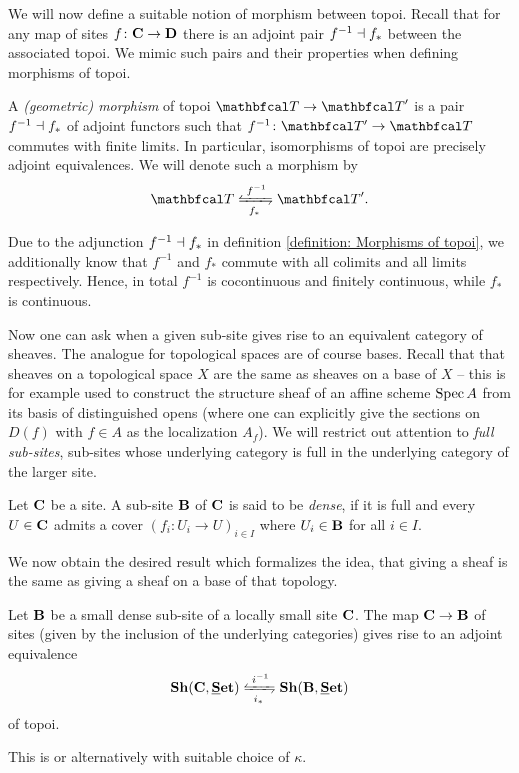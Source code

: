We will now define a suitable notion of morphism between topoi. Recall that for any map of sites $f\colon {{\mathbf{C}}}\to{{\mathbf{D}}}$ there is an adjoint pair $f^{-1}\dashv f_\ast$ between the associated topoi. We mimic such pairs and their properties when defining morphisms of topoi.
\begin{definition}
	\label{definition: Morphisms of topoi}
	
	A \emph{(geometric) morphism} of topoi $\category T\to \category T'$ is a pair $f^{-1} \dashv f_\ast$ of adjoint functors such that $f^{-1}\colon \category{T'}\to\category{T}$ commutes with finite limits. In particular, isomorphisms of topoi are precisely adjoint equivalences. We will denote such a morphism by
		$$\category T \xleftrightarrows{f^{-1}}{f_\ast} \category T'.$$
\end{definition}

\begin{remark}
	Due to the adjunction $f^{-1} \dashv f_\ast$ in definition \ref{definition: Morphisms of topoi}, we additionally know that $f^{-1}$ and $f_\ast$ commute with all colimits and all limits respectively. Hence, in total $f^{-1}$ is cocontinuous and finitely continuous, while $f_\ast$ is continuous.
\end{remark}

Now one can ask when a given sub-site gives rise to an equivalent category of sheaves. The analogue for topological spaces are of course bases. Recall that that sheaves on a topological space $X$ are the same as sheaves on a base of $X$ -- this is for example used to construct the structure sheaf of an affine scheme $\operatorname{Spec} A$ from its basis of distinguished opens (where one can explicitly give the sections on $D(f)$ with $f\in A$ as the localization $A_f$). We will restrict out attention to \emph{full sub-sites}, \ie sub-sites whose underlying category is full in the underlying category of the larger site.
\begin{definition}
	Let ${{\mathbf{C}}}$ be a site. A sub-site ${{\mathbf{B}}}$ of ${{\mathbf{C}}}$ is said to be \emph{dense}, if it is full and every $U\in {{\mathbf{C}}}$ admits a cover $(f_i\colon U_i\to U)_{i\in I}$ where $U_i\in {{\mathbf{B}}}$ for all $i\in I$.
\end{definition}

We now obtain the desired result which formalizes the idea, that giving a sheaf is the same as giving a sheaf on a base of that topology.
\begin{lemma}
	\label{lemma: comparison lemma}
	Let ${{\mathbf{B}}}$ be a small dense sub-site of a locally small site ${{\mathbf{C}}}$. The map ${{\mathbf{C}}}\to{{\mathbf{B}}}$ of sites (given by the inclusion of the underlying categories) gives rise to an adjoint equivalence
		$$\Sheaves{\site C}{\Set}\xleftrightarrows{i^{-1}}{i_\ast} \Sheaves{\site B}{\Set}$$
	of topoi.
\end{lemma}
\begin{shortproof}
	This is \cite[C2.2.3]{elephant2} or alternatively \cite[Thm. 11.8]{shulman2012exactcompletionssmallsheaves} with suitable choice of $\kappa$.
\end{shortproof}

